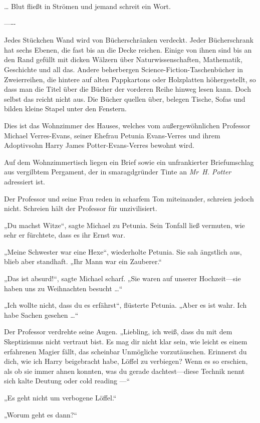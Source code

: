 {{… Blut fließt in Strömen und jemand schreit ein Wort.}

—\/-\/-

Jedes Stückchen Wand wird von Bücherschränken verdeckt. Jeder Bücherschrank hat sechs Ebenen, die fast bis an die Decke reichen. Einige von ihnen sind bis an den Rand gefüllt mit dicken Wälzern über Naturwissenschaften, Mathematik, Geschichte und all das. Andere beherbergen Science-Fiction-Taschenbücher in Zweierreihen, die hintere auf alten Pappkartons oder Holzplatten höhergestellt, so dass man die Titel über die Bücher der vorderen Reihe hinweg lesen kann. Doch selbst das reicht nicht aus. Die Bücher quellen über, belegen Tische, Sofas und bilden kleine Stapel unter den Fenstern.

Dies ist das Wohnzimmer des Hauses, welches vom außergewöhnlichen Professor Michael Verres-Evans, seiner Ehefrau Petunia Evans-Verres und ihrem Adoptivsohn Harry James Potter-Evans-Verres bewohnt wird.

Auf dem Wohnzimmertisch liegen ein Brief sowie ein unfrankierter Briefumschlag aus vergilbtem Pergament, der in smaragdgründer Tinte an \emph{Mr~H. Potter} adressiert ist.

Der Professor und seine Frau reden in scharfem Ton miteinander, schreien jedoch nicht. Schreien hält der Professor für unzivilisiert.

„Du machst Witze“, sagte Michael zu Petunia. Sein Tonfall ließ vermuten, wie sehr er fürchtete, dass es ihr Ernst war.

„Meine Schwester war eine Hexe“, wiederholte Petunia. Sie sah ängstlich aus, blieb aber standhaft. „Ihr Mann war ein Zauberer.“

„Das ist absurd!“, sagte Michael scharf. „Sie waren auf unserer Hochzeit—sie haben uns zu Weihnachten besucht …“

„Ich wollte nicht, dass du es erfährst“, flüsterte Petunia. „Aber es ist wahr. Ich habe Sachen gesehen …“

Der Professor verdrehte seine Augen. „Liebling, ich weiß, dass du mit dem Skeptizismus nicht vertraut bist. Es mag dir nicht klar sein, wie leicht es einem erfahrenen Magier fällt, das scheinbar Unmögliche vorzutäuschen. Erinnerst du dich, wie ich Harry beigebracht habe, Löffel zu verbiegen? Wenn es so erschien, als ob sie immer ahnen konnten, was du gerade dachtest—diese Technik nennt sich kalte Deutung oder cold reading —“

„Es geht nicht um verbogene Löffel.“

„Worum geht es dann?“

}
